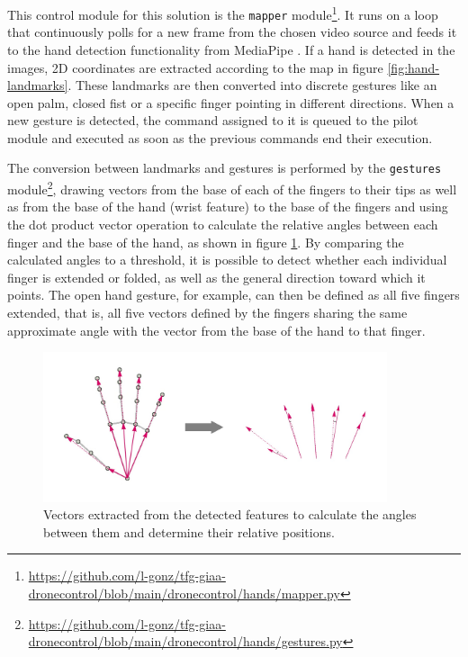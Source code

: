This control module for this solution is the \texttt{mapper} module\footnote{\url{https://github.com/l-gonz/tfg-giaa-dronecontrol/blob/main/dronecontrol/hands/mapper.py}}.
It runs on a loop that continuously polls for a new frame from the chosen video source and feeds it to the hand detection functionality from MediaPipe \cite{mp-hands-paper}.
If a hand is detected in the images, 2D coordinates are extracted according to the map in figure \ref{fig:hand-landmarks}.
These landmarks are then converted into discrete gestures like an open palm, closed fist or a specific finger pointing in different directions.
When a new gesture is detected, the command assigned to it is queued to the pilot module and executed as soon as the previous commands end their execution.

The conversion between landmarks and gestures is performed by the \texttt{gestures} module\footnote{\url{https://github.com/l-gonz/tfg-giaa-dronecontrol/blob/main/dronecontrol/hands/gestures.py}}, drawing vectors from the base of each of the fingers to their tips as well as from the base of the hand (wrist feature) to the base of the fingers and using the dot product vector operation to calculate the relative angles between each finger and the base of the hand, as shown in figure \ref{fig:vector-calcs}.
By comparing the calculated angles to a threshold, it is possible to detect whether each individual finger is extended or folded, as well as the general direction toward which it points.
The open hand gesture, for example, can then be defined as all five fingers extended, that is, all five vectors defined by the fingers sharing the same approximate angle with the vector from the base of the hand to that finger.

\begin{figure}
  \centering
  \includegraphics[width=0.9\textwidth, keepaspectratio]{img/hand-vectors.jpg}
  \caption{Vectors extracted from the detected features to calculate the angles between them and determine their relative positions.}
  \label{fig:vector-calcs}
\end{figure}

